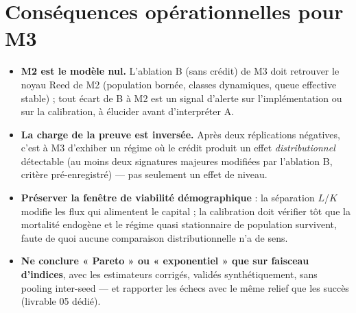 \documentclass[11pt,a4paper]{article}
\begin{document}
\section{Conséquences opérationnelles pour M3}

\begin{itemize}[leftmargin=1.4em, itemsep=3pt]
\item \textbf{M2 est le modèle nul.} L'ablation B (sans crédit) de M3 doit
  retrouver le noyau Reed de M2 (population bornée, classes dynamiques, queue
  effective stable) ; tout écart de B à M2 est un signal d'alerte sur
  l'implémentation ou sur la calibration, à élucider avant d'interpréter A.
\item \textbf{La charge de la preuve est inversée.} Après deux réplications
  négatives, c'est à M3 d'exhiber un régime où le crédit produit un effet
  \emph{distributionnel} détectable (au moins deux signatures majeures
  modifiées par l'ablation B, critère pré-enregistré) --- pas seulement un
  effet de niveau.
\item \textbf{Préserver la fenêtre de viabilité démographique} : la séparation
  $L$/$K$ modifie les flux qui alimentent le capital ; la calibration doit
  vérifier tôt que la mortalité endogène et le régime quasi stationnaire de
  population survivent, faute de quoi aucune comparaison distributionnelle
  n'a de sens.
\item \textbf{Ne conclure « Pareto » ou « exponentiel » que sur faisceau
  d'indices}, avec les estimateurs corrigés, validés synthétiquement, sans
  pooling inter-seed --- et rapporter les échecs avec le même relief que les
  succès (livrable 05 dédié).
\end{itemize}
\end{document}
